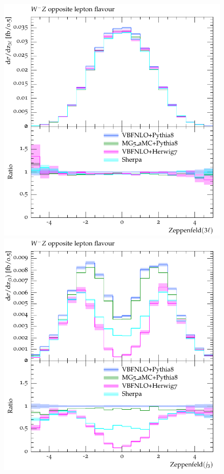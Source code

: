 \documentclass[11pt]{cernrep}
\begin{document}
\begin{figure}[htbp]
\begin{center}
   \includegraphics[scale=0.65]{figs/VBFNLO_WmZ_OF_zep3l}
   \includegraphics[scale=0.65]{figs/VBFNLO_WmZ_OF_zepj3}

\end{center}
\end{figure}
\end{document}

